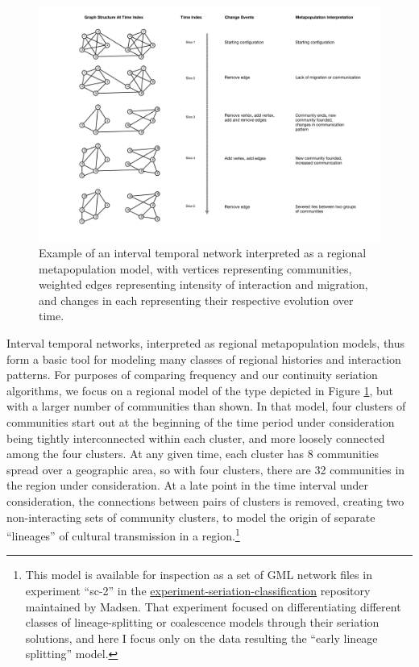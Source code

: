 \begin{figure}[ht]
\centering
\includegraphics[scale=0.25]{graphics/multipleseriation/interval-temporal-network-with-interpretation.pdf}
\caption{Example of an interval temporal network interpreted as a regional metapopulation model, with vertices representing communities, weighted edges representing intensity of interaction and migration, and changes in each representing their respective evolution over time.}
\label{img:itn-example}
\end{figure}

Interval temporal networks, interpreted as regional metapopulation
models, thus form a basic tool for modeling many classes of regional
histories and interaction patterns. For purposes of comparing frequency
and our continuity seriation algorithms, we focus on a regional model of
the type depicted in Figure \ref{img:itn-example}, but with a larger
number of communities than shown. In that model, four clusters of
communities start out at the beginning of the time period under
consideration being tightly interconnected within each cluster, and more
loosely connected among the four clusters. At any given time, each
cluster has 8 communities spread over a geographic area, so with four
clusters, there are 32 communities in the region under consideration. At
a late point in the time interval under consideration, the connections
between pairs of clusters is removed, creating two non-interacting sets
of community clusters, to model the origin of separate ``lineages'' of
cultural transmission in a region.\footnote{This model is available for
  inspection as a set of GML network files in experiment ``sc-2'' in the
  \href{https://github.com/mmadsen/experiment-seriation-classification}{experiment-seriation-classification}
  repository maintained by Madsen. That experiment focused on
  differentiating different classes of lineage-splitting or coalescence
  models through their seriation solutions, and here I focus only on the
  data resulting the ``early lineage splitting'' model.}

